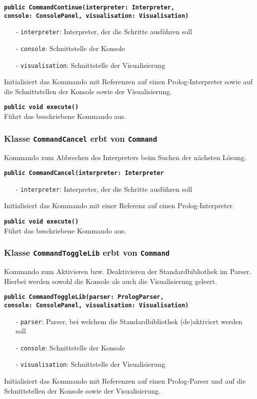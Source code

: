 \documentclass[parskip=full,11pt,twoside]{scrartcl}
\begin{document}
\textbf{\texttt{public CommandContinue(interpreter: Interpreter,\\console: ConsolePanel, visualisation: Visualisation)}}\\
\begin{itemize}[noitemsep]
	\item[-] \texttt{interpreter}: Interpreter, der die Schritte ausführen soll
	\item[-] \texttt{console}: Schnittstelle der Konsole
	\item[-] \texttt{visualisation}: Schnittstelle der Visualisierung
\end{itemize}
Initialisiert das Kommando mit Referenzen auf einen Prolog-Interpreter sowie auf die Schnittstellen der Konsole sowie der Visualisierung.

\textbf{\texttt{public void execute()}}\\
Führt das beschriebene Kommando aus.

\subsubsection{Klasse \texttt{CommandCancel} erbt von \texttt{Command}}
Kommando zum Abbrechen des Interpreters beim Suchen der nächsten Lösung.

\textbf{\texttt{public CommandCancel(interpreter: Interpreter}}\\
\begin{itemize}[noitemsep]
	\item[-] \texttt{interpreter}: Interpreter, der die Schritte ausführen soll
\end{itemize}
Initialisiert das Kommando mit einer Referenz auf einen Prolog-Interpreter.

\textbf{\texttt{public void execute()}}\\
Führt das beschriebene Kommando aus.

\subsubsection{Klasse \texttt{CommandToggleLib} erbt von \texttt{Command}}
Kommando zum Aktivieren bzw. Deaktivieren der Standardbibliothek im Parser. Hierbei werden sowohl die Konsole als auch die Visualisierung geleert.

\textbf{\texttt{public CommandToggleLib(parser: PrologParser,\\console: ConsolePanel, visualisation: Visualisation)}}\\
\begin{itemize}[noitemsep]
	\item[-] \texttt{parser}: Parser, bei welchem die Standardbibliothek (de)aktiviert werden soll
	\item[-] \texttt{console}: Schnittstelle der Konsole
	\item[-] \texttt{visualisation}: Schnittstelle der Visualisierung
\end{itemize}
Initialisiert das Kommando mit Referenzen auf einen Prolog-Parser und auf die Schnittstellen der Konsole sowie der Visualisierung.
\end{document}
